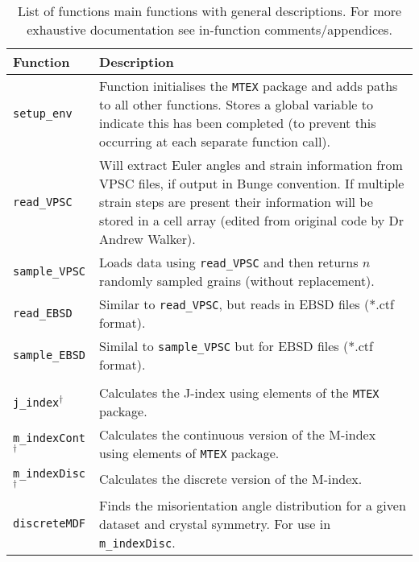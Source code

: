 \documentclass[a4paper,12pt]{report}
\numberwithin{equation}{chapter}
\begin{document}
\begin{table}[p!] 
	\centering
	\caption[VPSC datasets]{List of functions main functions with general descriptions. For more exhaustive documentation see in-function comments/appendices.}
	\noindent
	
\begin{tabularx}{\textwidth}{lX}

\hline
\hline
Function    & Description   \\ 
\hline
\hline

\texttt{setup\_{}env} & Function initialises the \texttt{MTEX} package and adds paths to all other functions. Stores a global variable to indicate this has been completed (to prevent this occurring at each separate function call). \\  

\texttt{read\_{}VPSC} & Will extract Euler angles and strain information from VPSC files, if output in Bunge convention. If multiple strain steps are present their information will be stored in a cell array (edited from original code by Dr Andrew Walker). \\ 

\texttt{sample\_{}VPSC} & Loads data using \texttt{read\_{}VPSC} and then returns $n$ randomly sampled grains (without replacement). \\  

\texttt{read\_{}EBSD} & Similar to \texttt{read\_{}VPSC}, but reads in EBSD files (*.ctf format). \\

\texttt{sample\_{}EBSD} & Similal to \texttt{sample\_{}VPSC} but for EBSD files (*.ctf format). \\ 
\\
\hline
\hline

\texttt{j\_{}index}$^{\dagger}$ & Calculates the J-index using elements of the \texttt{MTEX} package. \\ 

\texttt{m\_{}indexCont}$^{\dagger}$ & Calculates the continuous version of the M-index using elements of \texttt{MTEX} package. \\

\texttt{m\_{}indexDisc}$^{\dagger}$ & Calculates the discrete version of the M-index. \\

\texttt{discreteMDF} & Finds the misorientation angle distribution for a given dataset and crystal symmetry. For use in \texttt{m\_{}indexDisc}. \\


\end{tabularx}
\end{table}
\end{document}

